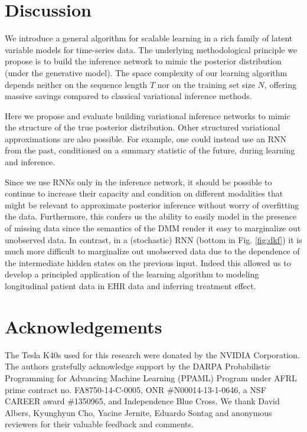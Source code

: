 \documentclass[letterpaper]{article}
\theoremstyle{plain}
\newcommand{\DMM}{DMM\xspace}
\begin{document}
{ \section{Discussion}

We introduce a general algorithm for scalable learning in a rich family of latent variable models for time-series data. The underlying methodological principle we propose is to build the inference network to mimic the posterior distribution (under the generative model).
The space complexity of our learning algorithm depends neither on the sequence
length $T$ nor on the training set size $N$, offering massive
savings compared to classical variational inference methods.

Here we propose and evaluate building variational inference networks to mimic
the structure of the true posterior distribution.  
Other structured variational approximations 
are also possible. For example, one could instead use an RNN 
from the past, conditioned on a summary statistic of the future,
during learning and inference.

Since we use RNNs only in the inference network, 
it should be possible to continue to increase their capacity and 
condition on different modalities that might be relevant to approximate 
posterior inference without worry of overfitting the data. 
Furthermore, this confers us the ability to easily model in the presence of missing data 
since the semantics of the \DMM render it easy to marginalize out unobserved data.
In contrast, in a (stochastic) RNN (bottom in Fig. \ref{fig:dkf}) it is much more difficult
to marginalize out unobserved data due to the dependence of the intermediate hidden states on the previous
input. Indeed this allowed us to develop a principled application of the learning algorithm to
modeling longitudinal patient data in EHR data and 
inferring treatment effect.  
 \section*{Acknowledgements}
The Tesla K40s used for this research were donated by the NVIDIA 
Corporation. The authors gratefully acknowledge support by the DARPA Probabilistic Programming for Advancing
Machine Learning (PPAML) Program under AFRL prime contract
no. FA8750-14-C-0005, ONR \#N00014-13-1-0646, a NSF CAREER award
\#1350965, and Independence Blue Cross. We thank David Albers, Kyunghyun Cho, Yacine Jernite, Eduardo Sontag and anonymous reviewers
for their valuable feedback and comments. 
 
}
\end{document}
